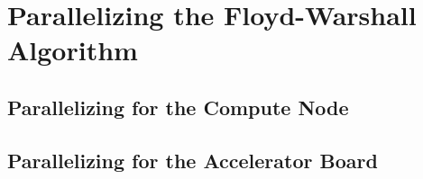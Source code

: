 
\section{Parallelizing the Floyd-Warshall Algorithm}
\label{sec-parallel}

\subsection{Parallelizing for the Compute Node}
\label{sec-parallel-node}



\subsection{Parallelizing for the Accelerator Board}
\label{sec-parallel-device}
